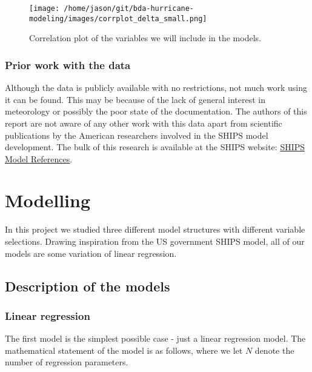 \documentclass[
]{article}
\begin{document}
\begin{figure}
\centering
\texttt{[image: /home/jason/git/bda-hurricane-modeling/images/corrplot\_delta\_small.png]}
\caption{Correlation plot of the variables we will include in the
models.}
\end{figure}

\hypertarget{prior-work-with-the-data}{%
\subsubsection{Prior work with the
data}\label{prior-work-with-the-data}}

Although the data is publicly available with no restrictions, not much
work using it can be found. This may be because of the lack of general
interest in meteorology or possibly the poor state of the documentation.
The authors of this report are not aware of any other work with this
data apart from scientific publications by the American researchers
involved in the SHIPS model development. The bulk of this research is
available at the SHIPS website:
\href{http://rammb.cira.colostate.edu/research/tropical_cyclones/ships/references.asp}{SHIPS
Model References}.

\hypertarget{modelling}{%
\section{Modelling}\label{modelling}}

In this project we studied three different model structures with
different variable selections. Drawing inspiration from the US
government SHIPS model, all of our models are some variation of linear
regression.

\hypertarget{description-of-the-models}{%
\subsection{Description of the models}\label{description-of-the-models}}

\hypertarget{linear-regression}{%
\subsubsection{Linear regression}\label{linear-regression}}

The first model is the simplest possible case - just a linear regression
model. The mathematical statement of the model is as follows, where we
let \(N\) denote the number of regression parameters.
\end{document}
